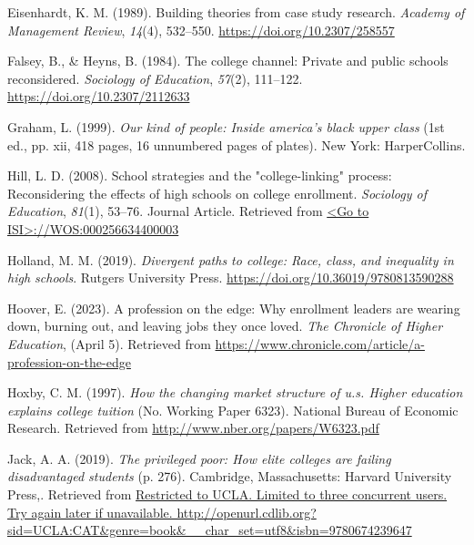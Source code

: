 \documentclass[
  12pt,
]{article}
\newlength{\cslhangindent}
\newlength{\cslentryspacingunit} %
\newenvironment{CSLReferences}[2] %
 {%
  \setlength{\parindent}{0pt}
  \ifodd #1
  \let\oldpar\par
  \def\par{\hangindent=\cslhangindent\oldpar}
  \fi
  \setlength{\parskip}{#2\cslentryspacingunit}
 }%
 {}
\begin{document}
\begin{CSLReferences}{1}{0}
\leavevmode{}%
Eisenhardt, K. M. (1989). Building theories from case study research. \emph{Academy of Management Review}, \emph{14}(4), 532--550. \url{https://doi.org/10.2307/258557}

\leavevmode{}%
Falsey, B., \& Heyns, B. (1984). The college channel: Private and public schools reconsidered. \emph{Sociology of Education}, \emph{57}(2), 111--122. \url{https://doi.org/10.2307/2112633}

\leavevmode{}%
Graham, L. (1999). \emph{Our kind of people: Inside america's black upper class} (1st ed., pp. xii, 418 pages, 16 unnumbered pages of plates). New York: HarperCollins.

\leavevmode{}%
Hill, L. D. (2008). School strategies and the "college-linking" process: Reconsidering the effects of high schools on college enrollment. \emph{Sociology of Education}, \emph{81}(1), 53--76. Journal Article. Retrieved from \href{\%3CGo\%20to\%20ISI\%3E://WOS:000256634400003}{\textless Go to ISI\textgreater://WOS:000256634400003}

\leavevmode{}%
Holland, M. M. (2019). \emph{Divergent paths to college: Race, class, and inequality in high schools}. Rutgers University Press. \url{https://doi.org/10.36019/9780813590288}

\leavevmode{}%
Hoover, E. (2023). A profession on the edge: Why enrollment leaders are wearing down, burning out, and leaving jobs they once loved. \emph{The Chronicle of Higher Education}, (April 5). Retrieved from \url{https://www.chronicle.com/article/a-profession-on-the-edge}

\leavevmode{}%
Hoxby, C. M. (1997). \emph{How the changing market structure of u.s. Higher education explains college tuition} (No. Working Paper 6323). National Bureau of Economic Research. Retrieved from \url{http://www.nber.org/papers/W6323.pdf}

\leavevmode{}%
Jack, A. A. (2019). \emph{The privileged poor: How elite colleges are failing disadvantaged students} (p. 276). Cambridge, Massachusetts: Harvard University Press,. Retrieved from \href{Restricted\%20to\%20UCLA.\%20Limited\%20to\%20three\%20concurrent\%20users.\%20Try\%20again\%20later\%20if\%20unavailable.\%20http://openurl.cdlib.org?sid=UCLA:CAT\&genre=book\&__char_set=utf8\&isbn=9780674239647}{Restricted to UCLA. Limited to three concurrent users. Try again later if unavailable. http://openurl.cdlib.org?sid=UCLA:CAT\&genre=book\&\_\_char\_set=utf8\&isbn=9780674239647}


\end{CSLReferences}
\end{document}
